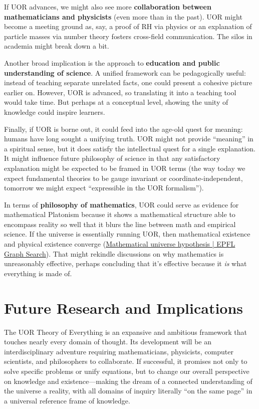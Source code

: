 \documentclass[12pt]{article}
\begin{document}
\medskip

If UOR advances, we might also see more \textbf{collaboration between mathematicians and physicists} (even more than in the past). UOR might become a meeting ground as, say, a proof of RH via physics or an explanation of particle masses via number theory fosters cross-field communication. The silos in academia might break down a bit.

\medskip

Another broad implication is the approach to \textbf{education and public understanding of science}. A unified framework can be pedagogically useful: instead of teaching separate unrelated facts, one could present a cohesive picture earlier on. However, UOR is advanced, so translating it into a teaching tool would take time. But perhaps at a conceptual level, showing the unity of knowledge could inspire learners.

\medskip

Finally, if UOR is borne out, it could feed into the age-old quest for meaning: humans have long sought a unifying truth. UOR might not provide ``meaning'' in a spiritual sense, but it does satisfy the intellectual quest for a single explanation. It might influence future philosophy of science in that any satisfactory explanation might be expected to be framed in UOR terms (the way today we expect fundamental theories to be gauge invariant or coordinate-independent, tomorrow we might expect ``expressible in the UOR formalism''). 

\medskip

In terms of \textbf{philosophy of mathematics}, UOR could serve as evidence for mathematical Platonism because it shows a mathematical structure able to encompass reality so well that it blurs the line between math and empirical science. If the universe is essentially running UOR, then mathematical existence and physical existence converge (\href{https://graphsearch.epfl.ch/concept/2148329#:~:text=proposed%20by%20cosmologist%20Max%20Tegmark,The}{Mathematical universe hypothesis | EPFL Graph Search}). That might rekindle discussions on why mathematics is unreasonably effective, perhaps concluding that it's effective because it \emph{is} what everything is made of.

\section{Future Research and Implications}

The UOR Theory of Everything is an expansive and ambitious framework that touches nearly every domain of thought. Its development will be an interdisciplinary adventure requiring mathematicians, physicists, computer scientists, and philosophers to collaborate. If successful, it promises not only to solve specific problems or unify equations, but to change our overall perspective on knowledge and existence---making the dream of a connected understanding of the universe a reality, with all domains of inquiry literally ``on the same page'' in a universal reference frame of knowledge.
\end{document}
